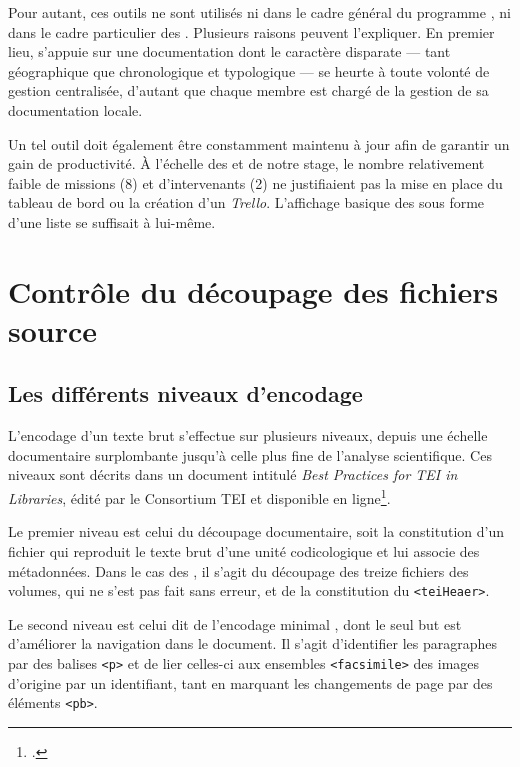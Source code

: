 Pour autant, ces outils ne sont utilisés ni dans le cadre général du programme \timeus, ni dans le cadre particulier des \odm. Plusieurs raisons peuvent l'expliquer. En premier lieu, \timeus{} s'appuie sur une documentation dont le caractère disparate --- tant géographique que chronologique et typologique --- se heurte à toute volonté de gestion centralisée, d'autant que chaque membre est chargé de la gestion de sa documentation locale.

Un tel outil doit également être constamment maintenu à jour afin de garantir un gain de productivité. À l'échelle des \odm{} et de notre stage, le nombre relativement faible de missions (8) et d'intervenants (2) ne justifiaient pas la mise en place du tableau de bord \gitlab{} ou la création d'un \textit{Trello}. L'affichage basique des \issues{} sous forme d'une liste se suffisait à lui-même.

\chapter{Contrôle du découpage des fichiers source}

\section{Les différents niveaux d'encodage}

L'encodage d'un texte brut s'effectue sur plusieurs niveaux, depuis une échelle documentaire surplombante jusqu'à celle plus fine de l'analyse scientifique. Ces niveaux sont décrits dans un document intitulé \textit{Best Practices for TEI in Libraries}, édité par le Consortium TEI et disponible en ligne\footcite[\textit{4.2. Encoding Levels}]{bestpratice}.

Le premier niveau est celui du découpage documentaire, soit la constitution d'un fichier qui reproduit le texte brut d'une unité codicologique et lui associe des métadonnées. Dans le cas des \odm, il s'agit du découpage des treize fichiers des volumes, qui ne s'est pas fait sans erreur, et de la constitution du \texttt{<teiHeaer>}.

Le second niveau est celui dit de l'encodage \og minimal \fg, dont le seul but est d'améliorer la navigation dans le document. Il s'agit d'identifier les paragraphes par des balises \texttt{<p>} et de lier celles-ci aux ensembles \texttt{<facsimile>} des images d'origine par un identifiant, tant en marquant les changements de page par des éléments \texttt{<pb>}.

